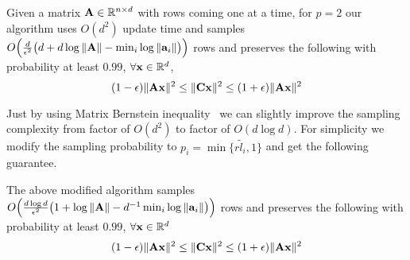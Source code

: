 \begin{corollary}\label{lem:matrixcoreset}
 Given a matrix $\mathbf{A} \in \mathbb{R}^{n\times d}$ with rows coming one at a time, for $p=2$ our algorithm uses $O(d^{2})$ update time and samples $O\Big(\frac{d}{\epsilon^{2}}\big(d+d\log\|\mathbf{A}\|-\min_{i}\log \|\mathbf{a}_{i}\|\big)\Big)$ rows and preserves the following with probability at least $0.99$, $\forall \mathbf{x} \in \mathbb{R}^{d}$,
 \begin{equation*}
  (1-\epsilon)\|\mathbf{A}\mathbf{x}\|^{2} \leq \|\mathbf{C}\mathbf{x}\|^{2} \leq (1+\epsilon)\|\mathbf{A}\mathbf{x}\|^{2}
 \end{equation*}
\end{corollary}
% 
Just by using Matrix Bernstein inequality~\cite{tropp2011freedman} we can slightly improve the sampling complexity from factor of $O(d^{2})$ to factor of $O(d\log d)$. For simplicity we modify the sampling probability to $p_{i} = \min\{r\tilde{l}_{i},1\}$ and get the following guarantee.
\begin{theorem}{\label{thm:improvedMatrixCoreset}}
 The above modified algorithm samples $O\Big(\frac{d\log d}{\epsilon^{2}}\big(1+\log\|\mathbf{A}\|-d^{-1}\min_{i} \log \|\mathbf{a}_{i}\|\big)\Big)$ rows and preserves the following with probability at least $0.99$, $\forall \mathbf{x} \in \mathbb{R}^{d}$
 \begin{align*}
  (1-\epsilon)\|\mathbf{A}\mathbf{x}\|^{2} \leq \|\mathbf{C}\mathbf{x}\|^{2} \leq (1+\epsilon)\|\mathbf{A}\mathbf{x}\|^{2}
 \end{align*}
\end{theorem}
